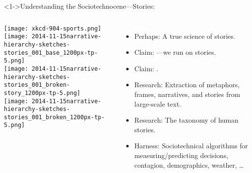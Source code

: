 \begin{frame}
  
 
  \begin{block}<1->{Understanding the Sociotechnocene---Stories:}
    \begin{columns}
      \texttt{[image: xkcd-904-sports.png]}\\
      {\tiny
      }
      \texttt{[image: 2014-11-15narrative-hierarchy-sketches-stories\_001\_base\_1200px-tp-5.png]}\\
      \texttt{[image: 2014-11-15narrative-hierarchy-sketches-stories\_001\_broken-story\_1200px-tp-5.png]}\\
      \texttt{[image: 2014-11-15narrative-hierarchy-sketches-stories\_001\_broken\_1200px-tp-5.png]}\\
      \begin{itemize}
      \item<+-> 
        Perhaps: A true science of stories.
      \item<+->
        Claim: ---we run on stories.
      \item<+-> 
        Claim:
        .
      \item<+->
        Research: Extraction of metaphors, frames, narratives, and stories from large-scale text.
      \item<+-> 
        Research: The taxonomy of human stories.
      \item<+-> 
        Harness: Sociotechnical algorithms for measuring/predicting decisions, contagion, demographics, weather, \ldots
      \end{itemize}
    \end{columns}
  \end{block}

\end{frame}

